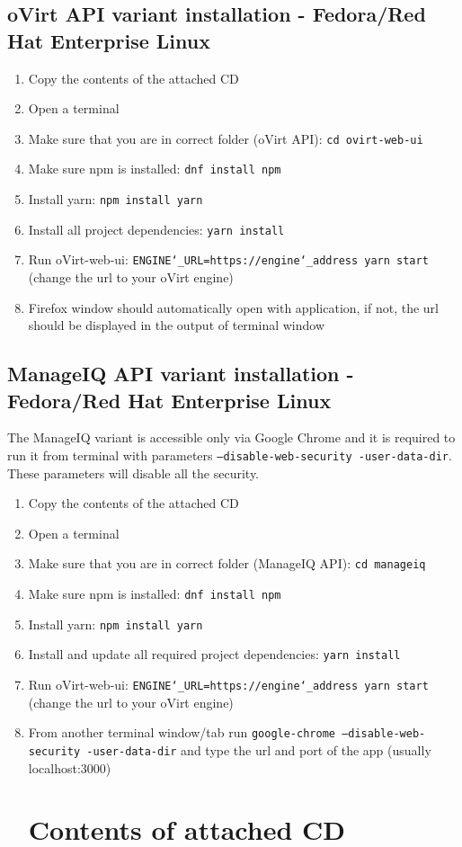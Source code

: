 \section{oVirt API variant installation - Fedora/Red Hat Enterprise Linux}
\begin{enumerate}

\item Copy the contents of the attached CD 
\item Open a terminal
\item Make sure that you are in correct folder (oVirt API): \texttt{cd ovirt-web-ui}
\item Make sure npm is installed: \texttt{dnf install npm}
\item Install yarn: \texttt{npm install yarn}
\item Install all project dependencies: \texttt{yarn install}
\item Run oVirt-web-ui: \texttt{ENGINE\char`_URL=https://engine\char`_address yarn start} (change the url to your oVirt engine)
\item Firefox window should automatically open with application, if not, the url should be displayed in the output of terminal window
\end{enumerate} 

\newpage
\section{ManageIQ API variant installation - Fedora/Red Hat Enterprise Linux}
The ManageIQ variant is accessible only via Google Chrome and it is required to run it from terminal with parameters \texttt{--disable-web-security -user-data-dir}. These parameters will disable all the security.
\begin{enumerate}

\item Copy the contents of the attached CD 
\item Open a terminal
\item Make sure that you are in correct folder (ManageIQ API): \texttt{cd manageiq}
\item Make sure npm is installed: \texttt{dnf install npm}
\item Install yarn: \texttt{npm install yarn}
\item Install and update all required project dependencies: \texttt{yarn install}
\item Run oVirt-web-ui: \texttt{ENGINE\char`_URL=https://engine\char`_address yarn start} (change the url to your oVirt engine)
\item From another terminal window/tab run \texttt{google-chrome --disable-web-security -user-data-dir} and type the url and port of the app (usually localhost:3000)

\chapter{Contents of attached CD}

\end{enumerate} 
